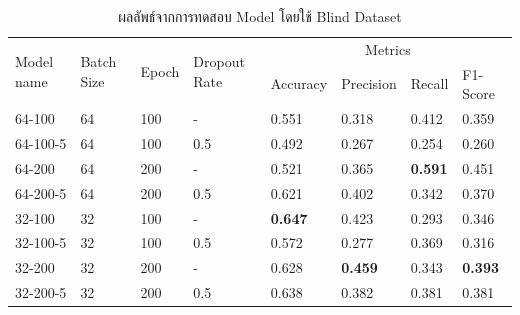 \begin{table}[ht]
    \centering
    \caption{ผลลัพธ์จากการทดสอบ Model  โดยใช้ Blind Dataset}
    \label{tab:model_test_performance}
    \begin{tabular}{|l|l|l|l|l|l|l|l|}

        \hline
        \multirow{2}{*}{Model name} & \multirow{2}{*}{Batch Size} & \multirow{2}{*}{Epoch} & \multirow{2}{*}{Dropout Rate} & \multicolumn{4}{c|}{Metrics}                                                    \\ \cline{5-8}
                                    &                             &                        &                               & Accuracy                     & Precision      & Recall         & F1-Score       \\ \hline
        64-100                      & 64                          & 100                    & -                             & 0.551                        & 0.318          & 0.412          & 0.359          \\ \hline
        64-100-5                    & 64                          & 100                    & 0.5                           & 0.492                        & 0.267          & 0.254          & 0.260          \\ \hline
        64-200                      & 64                          & 200                    & -                             & 0.521                        & 0.365          & \textbf{0.591} & 0.451          \\ \hline
        64-200-5                    & 64                          & 200                    & 0.5                           & 0.621                        & 0.402          & 0.342          & 0.370          \\ \hline
        32-100                      & 32                          & 100                    & -                             & \textbf{0.647}               & 0.423          & 0.293          & 0.346          \\ \hline
        32-100-5                    & 32                          & 100                    & 0.5                           & 0.572                        & 0.277          & 0.369          & 0.316          \\ \hline
        32-200                      & 32                          & 200                    & -                             & 0.628                        & \textbf{0.459} & 0.343          & \textbf{0.393} \\ \hline
        32-200-5                    & 32                          & 200                    & 0.5                           & 0.638                        & 0.382          & 0.381          & 0.381          \\ \hline
    \end{tabular}
\end{table}

